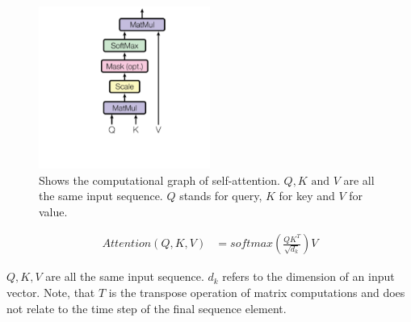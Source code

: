 \documentclass[./../../paper.tex]{subfiles}
\begin{document}
\begin{figure}[htb]
    \centering
    \includegraphics[width=0.5\textwidth]{figures/selfattention.png}
    \caption{Shows the computational graph of self-attention. $Q, K \text{ and } V$ are all the same input sequence. $Q$ stands for query, $K$ for key and $V$ for value.}
    \label{fig:selfattention}
\end{figure}


\begin{align}
    \label{eq:selfattention}
    Attention(Q, K, V) &= softmax(\frac{QK^T}{\sqrt{d_k}})V 
\end{align}

$Q, K, V$ are all the same input sequence. $d_k$ refers to the dimension of an input vector. Note, that $T$ is the transpose operation of matrix computations and does not relate to the time step of the final sequence element. 
\end{document}
